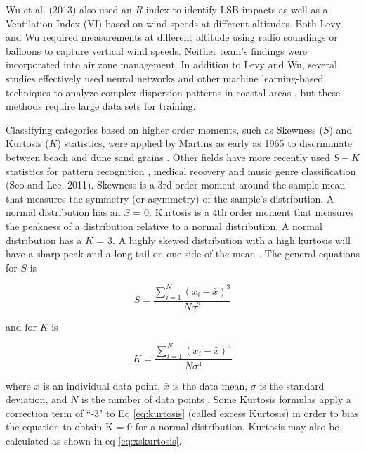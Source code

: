 Wu et al. (2013) also used an $R$ index to identify LSB impacts as well as a Ventilation Index (VI) based on wind speeds at different altitudes.  Both Levy and Wu required measurements at different altitude using radio soundings or balloons to capture vertical wind speeds.  Neither team’s findings were incorporated into air zone management.  In addition to Levy and Wu, several studies effectively used neural networks and other machine learning-based techniques to analyze complex dispersion patterns in coastal areas \citep{Elangasinghe2014, Feng2015}, but these methods require large data sets for training. 

Classifying categories based on higher order moments, such as Skewness ($S$) and Kurtosis ($K$) statistics, were applied by Martins as early as 1965 to discriminate between beach and dune sand grains \citep{Martins1965}.  Other fields have more recently used $S-K$ statistics for pattern recognition \citep{Crosilla2013}, medical recovery \citep{Chi2008} and music genre classification (Seo and Lee, 2011).  Skewness is a 3rd order moment around the sample mean that measures the symmetry (or asymmetry) of the sample’s distribution. A normal distribution has an $S$ = 0. Kurtosis is a 4th order moment that measures the peakness of a distribution relative to a normal distribution. A normal distribution has a $K$ = 3. A highly skewed distribution with a high kurtosis will have a sharp peak and a long tail on one side of the mean \citep{NIST2016}.  The general equations for $S$ is

\begin{equation}
\label{eq:skewness}
S = \frac{\sum_{i=1}^{N}\left (x_{i}-\bar{x} \right )^{3}}{N\sigma^{3}}
\end{equation}

\noindent
and for $K$ is 

\begin{equation}
\label{eq:kurtosis}
K = \frac{\sum_{i=1}^{N}\left (x_{i}-\bar{x} \right )^{4}}{N\sigma^{4}}
\end{equation}

\noindent
where $x$ is an individual data point, $\bar{x}$ is the data mean, $\sigma$ is the standard deviation, and $N$ is the number of data points \citep{Cristelli2012}.    Some Kurtosis formulas apply a correction term of ``-3" to Eq \ref{eq:kurtosis} (called excess Kurtosis) in order to bias the equation to obtain K = 0 for a normal distribution.  Kurtosis may also be calculated as shown in eq \ref{eq:xskurtosis}.

